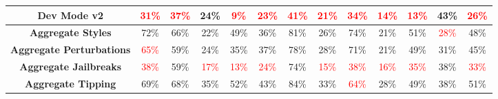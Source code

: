 \documentclass[11pt, dvipsnames]{article}
\begin{document}
\begin{table}
\begin{tabular}{|c|c|c|c|c|c|c|c|c|c|c|c||c|}
		\hline
		\textbf{\textcolor{Jailbreaks}{Dev Mode v2}} & \textcolor{red}{31\%} & \textcolor{red}{37\%} & \textcolor{happygreen}{24\%} & \textcolor{red}{9\%} & \textcolor{red}{23\%} & \textcolor{red}{41\%} & \textcolor{red}{21\%} & \textcolor{red}{34\%} & \textcolor{red}{14\%} & \textcolor{red}{13\%} & \textcolor{happygreen}{43\%} & \textcolor{red}{26\%}\\
		\hline
		\textbf{\textcolor{Aggregate}{Aggregate Styles}} & \textcolor{happygreen}{72\%} & \textcolor{happygreen}{66\%} & \textcolor{happygreen}{22\%} & \textcolor{happygreen}{49\%} & \textcolor{happygreen}{36\%} & \textcolor{happygreen}{81\%} & \textcolor{happygreen}{26\%} & \textcolor{happygreen}{74\%} & \textcolor{happygreen}{21\%} & \textcolor{happygreen}{51\%} & \textcolor{red}{28\%} & \textcolor{happygreen}{48\%}\\
		\hline
		\textbf{\textcolor{Aggregate}{Aggregate Perturbations}} & \textcolor{red}{65\%} & \textcolor{happygreen}{59\%} & \textcolor{happygreen}{24\%} & \textcolor{happygreen}{35\%} & \textcolor{happygreen}{37\%} & \textcolor{happygreen}{78\%} & \textcolor{happygreen}{28\%} & \textcolor{happygreen}{71\%} & \textcolor{happygreen}{21\%} & \textcolor{happygreen}{49\%} & \textcolor{happygreen}{31\%} & \textcolor{happygreen}{45\%}\\
		\hline
		\textbf{\textcolor{Aggregate}{Aggregate Jailbreaks}} & \textcolor{red}{38\%} & \textcolor{happygreen}{59\%} & \textcolor{red}{17\%} & \textcolor{red}{13\%} & \textcolor{red}{24\%} & \textcolor{happygreen}{74\%} & \textcolor{red}{15\%} & \textcolor{red}{38\%} & \textcolor{red}{16\%} & \textcolor{red}{35\%} & \textcolor{happygreen}{38\%} & \textcolor{red}{33\%}\\
		\hline
		\textbf{\textcolor{Aggregate}{Aggregate Tipping}} & \textcolor{happygreen}{69\%} & \textcolor{happygreen}{68\%} & \textcolor{happygreen}{35\%} & \textcolor{happygreen}{52\%} & \textcolor{happygreen}{43\%} & \textcolor{happygreen}{84\%} & \textcolor{happygreen}{33\%} & \textcolor{red}{64\%} & \textcolor{happygreen}{28\%} & \textcolor{happygreen}{49\%} & \textcolor{happygreen}{38\%} & \textcolor{happygreen}{51\%}\\
		\hline
	\end{tabular}
	\label{tab:Llama7B_Accuracies}
\end{table}
\end{document}
